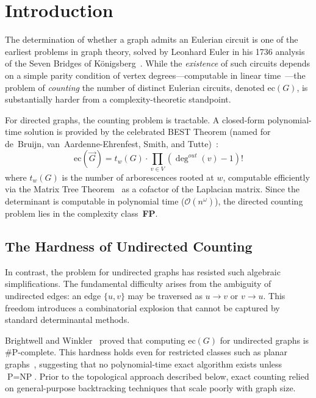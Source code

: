 \documentclass[acmsmall,review]{acmart}
\newcommand{\ec}{\text{ec}}
\newcommand{\bigO}{\mathcal{O}}
\begin{document}

\maketitle

	\section{Introduction}
	The determination of whether a graph admits an Eulerian circuit is one of the earliest problems in graph theory, solved by Leonhard Euler in his 1736 analysis of the Seven Bridges of K\"onigsberg~\cite{Euler1736}. While the \emph{existence} of such circuits depends on a simple parity condition of vertex degrees---computable in linear time~\cite{Hierholzer1873}---the problem of \emph{counting} the number of distinct Eulerian circuits, denoted $\ec(G)$, is substantially harder from a complexity-theoretic standpoint.
	
	For directed graphs, the counting problem is tractable. A closed-form polynomial-time solution is provided by the celebrated BEST Theorem (named for de~Bruijn, van~Aardenne-Ehrenfest, Smith, and Tutte)~\cite{Tutte1941, deBruijn1951}:
	\[
	\ec(\vec{G}) = t_w(G) \cdot \prod_{v \in V} (\deg^{out}(v)-1)!
	\]
	where $t_w(G)$ is the number of arborescences rooted at $w$, computable efficiently via the Matrix Tree Theorem~\cite{Kirchhoff1847} as a cofactor of the Laplacian matrix. Since the determinant is computable in polynomial time ($\bigO(n^\omega)$), the directed counting problem lies in the complexity class~\textbf{FP}.
	
	\subsection{The Hardness of Undirected Counting}
	In contrast, the problem for undirected graphs has resisted such algebraic simplifications. The fundamental difficulty arises from the ambiguity of undirected edges: an edge $\{u, v\}$ may be traversed as $u \to v$ or $v \to u$. This freedom introduces a combinatorial explosion that cannot be captured by standard determinantal methods.
	
	Brightwell and Winkler~\cite{Brightwell2005} proved that computing $\ec(G)$ for undirected graphs is \#P-complete. This hardness holds even for restricted classes such as planar graphs~\cite{Brightwell2010}, suggesting that no polynomial-time exact algorithm exists unless $\text{P} = \text{NP}$. Prior to the topological approach described below, exact counting relied on general-purpose backtracking techniques that scale poorly with graph size.
	
\end{document}
